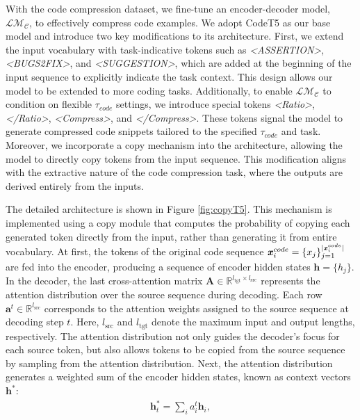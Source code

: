 With the code compression dataset, we fine-tune an encoder-decoder model, $\mathcal{LM_C}$, to effectively compress code examples. We adopt CodeT5 \citep{codet5} as our base model and introduce two key modifications to its architecture. First, we extend the input vocabulary with task-indicative tokens such as \textit{<ASSERTION>}, \textit{<BUGS2FIX>}, and \textit{<SUGGESTION>}, which are added at the beginning of the input sequence to explicitly indicate the task context. This design allows our model to be extended to more coding tasks. Additionally, to enable $\mathcal{LM_C}$ to condition on flexible $\tau_{code}$ settings, we introduce special tokens \textit{<Ratio>}, \textit{</Ratio>}, \textit{<Compress>}, and \textit{</Compress>}. These tokens signal the model to generate compressed code snippets tailored to the specified $\tau_{code}$ and task. Moreover, we incorporate a copy mechanism \citep{copy,copy1} into the architecture, allowing the model to directly copy tokens from the input sequence. This modification aligns with the extractive nature of the code compression task, where the outputs are derived entirely from the inputs.


The detailed architecture is shown in Figure \ref{fig:copyT5}. This mechanism is implemented using a copy module that computes the probability of copying each generated token directly from the input, rather than generating it from entire vocabulary. At first, the tokens of the original code sequence $\textbf{\textit{x}}_i^{code} = \{x_j\}_{j=1}^{|\textbf{\textit{x}}_i^{code}|}$  are fed into the encoder, producing a sequence of encoder hidden states $\textbf{h}=\{h_j\}$. In the decoder, the last cross-attention matrix $\mathbf{A} \in \mathbb{R}^{l_{\text{tgt}} \times l_{\text{src}}}$ represents the attention distribution over the source sequence during decoding. Each row $\mathbf{a}^t \in \mathbb{R}^{l_{\text{src}}}$ corresponds to the attention weights assigned to the source sequence at decoding step $t$. Here, $l_{\text{src}}$ and $l_{\text{tgt}}$ denote the maximum input and output lengths, respectively. The attention distribution not only guides the decoder’s focus for each source token, but also allows tokens to be copied from the source sequence by sampling from the attention distribution. Next, the attention distribution generates a weighted sum of the encoder hidden states, known as context vectors $\textbf{h}^*$:
\begin{align}
\textbf{h}_t^*=\sum_i a_i^t \textbf{h}_i, 
\end{align}

